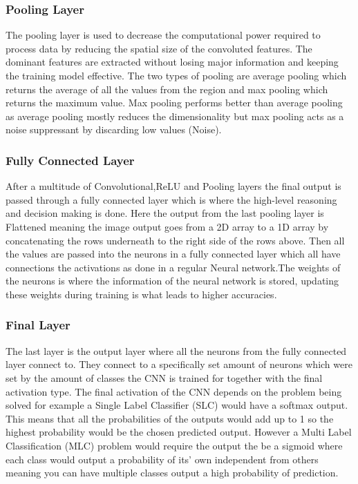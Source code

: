 \documentclass{csfyp}
\begin{document}
\subsubsection{Pooling Layer}
The pooling layer is used to decrease the computational power required to process data by reducing the spatial size of the convoluted features. The dominant features are extracted without losing major information and keeping the training model effective. The two types of pooling are average pooling which returns the average of all the values from the region and max pooling which returns the maximum value. Max pooling performs better than average pooling as average pooling mostly reduces the dimensionality but max pooling acts as a noise suppressant by discarding low values (Noise).

\subsubsection{Fully Connected Layer}
After a multitude of Convolutional,ReLU and Pooling layers the final output is passed through a fully connected layer which is where the high-level reasoning and decision making is done. Here the output from the last pooling layer is Flattened meaning the image output goes from a 2D array to a 1D array by concatenating the rows underneath to the right side of the rows above. Then all the values are passed into the neurons in a fully connected layer which all have connections the activations as done in a regular Neural network.The weights of the neurons is where the information of the neural network is stored, updating these weights during training is what leads to higher accuracies. 

\subsubsection{Final Layer}
The last layer is the output layer where all the neurons from the fully connected layer connect to. They connect to a specifically set amount of neurons which were set by the amount of classes the CNN is trained for together with the final activation type. The final activation of the CNN depends on the problem being solved for example a Single Label Classifier (SLC) would have a softmax output. This means that all the probabilities of the outputs would add up to 1 so the highest probability would be the chosen predicted output. However a Multi Label Classification (MLC) problem would require the output the be a sigmoid where each class would output a probability of its’ own independent from others meaning you can have multiple classes output a high probability of prediction. 
\end{document}

